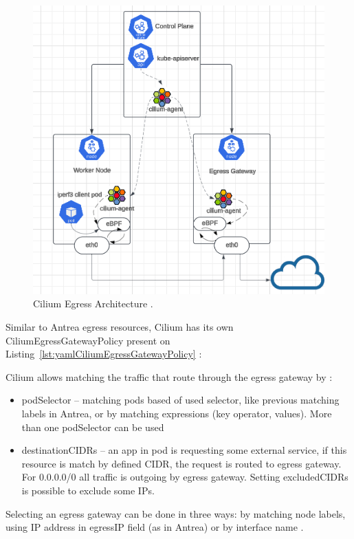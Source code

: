 \begin{figure}[tbh]
    \centering
    \includegraphics[width=0.9\columnwidth]{images/cilium_egress.png}
    \caption{Cilium Egress Architecture \cite{K8sIcons}\cite{LucidApp}\cite{CloudIcon2}\cite{CiliumEgressGatewayBlog}.}
    \label{fig:ciliumEgressArch}
\end{figure}

Similar to Antrea egress resources, Cilium has its own CiliumEgressGatewayPolicy present on Listing~\ref{lst:yamlCiliumEgressGatewayPolicy} \cite{CiliumEgressGateway}:

Cilium allows matching the traffic that route through the egress gateway by \cite{CiliumEgressGateway}:
\begin{itemize}
    \item podSelector -- matching pods based of used selector, like previous matching labels in Antrea, or by matching expressions (key operator, values). More than one podSelector can be used
    \item destinationCIDRs -- an app in pod is requesting some external service, if this resource is match by defined CIDR, the request is routed to egress gateway. For 0.0.0.0/0 all traffic is outgoing by egress gateway. Setting excludedCIDRs is possible to exclude some IPs.
\end{itemize}

Selecting an egress gateway can be done in three ways: by matching node labels, using IP address in egressIP field (as in Antrea) or by interface name \cite{CiliumEgressGateway}. 

